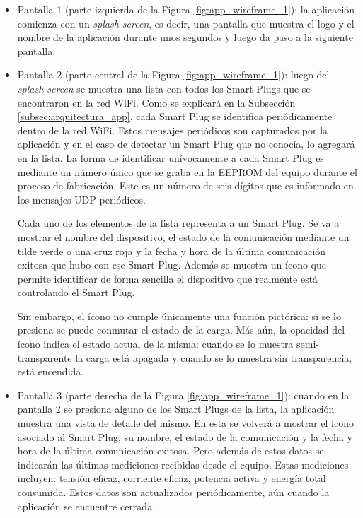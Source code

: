 \begin{itemize}
\item  Pantalla 1 (parte izquierda de la Figura \ref{fig:app_wireframe_1}): la aplicación comienza con un \textit{splash screen}, es decir, una pantalla que muestra el logo y el nombre de la aplicación durante unos segundos y luego da paso a la siguiente pantalla.

\item Pantalla 2 (parte central de la Figura \ref{fig:app_wireframe_1}): luego del \textit{splash screen} se muestra una lista con todos los Smart Plugs que se encontraron en la red WiFi. Como se explicará en la Subsección \ref{subsec:arquitectura_app}, cada Smart Plug se identifica periódicamente dentro de la red WiFi. Estos mensajes periódicos son capturados por la aplicación y en el caso de detectar un Smart Plug que no conocía, lo agregará en la lista. La forma de identificar unívocamente a cada Smart Plug es mediante un número único que se graba en la EEPROM del equipo durante el proceso de fabricación. Este es un número de seis dígitos que es informado en los mensajes UDP periódicos.

Cada uno de los elementos de la lista representa a un Smart Plug. Se va a mostrar el nombre del dispositivo, el estado de la comunicación mediante un tilde verde o una cruz roja y la fecha y hora de la última comunicación exitosa que hubo con ese Smart Plug. Además se muestra un ícono que permite identificar de forma sencilla el dispositivo que realmente está controlando el Smart Plug. 

Sin embargo, el ícono no cumple únicamente una función pictórica: si se lo presiona se puede conmutar el estado de la carga. Más aún, la opacidad del ícono indica el estado actual de la misma: cuando se lo muestra semi-transparente la carga está apagada y cuando se lo muestra sin transparencia, está encendida.

\item Pantalla 3 (parte derecha de la Figura \ref{fig:app_wireframe_1}): cuando en la pantalla 2 se presiona alguno de los Smart Plugs de la lista, la aplicación muestra una vista de detalle del mismo. En esta se volverá a mostrar el ícono asociado al Smart Plug, su nombre, el estado de la comunicación y la fecha y hora de la última comunicación exitosa. Pero además de estos datos se indicarán las últimas mediciones recibidas desde el equipo. Estas mediciones incluyen: tensión eficaz, corriente eficaz, potencia activa y energía total consumida. Estos datos son actualizados periódicamente, aún cuando la aplicación se encuentre cerrada.


\end{itemize}
